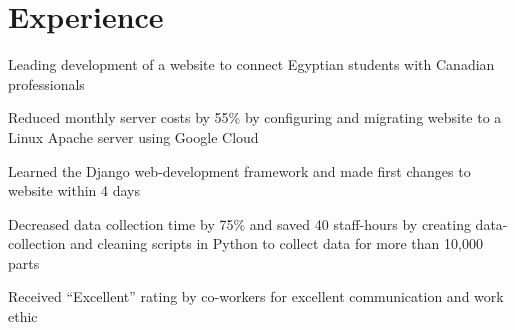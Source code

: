 \documentclass[12pt]{deedy-resume-openfont}
\begin{document}
%
%


%
%

\begin{minipage}[t] {0.66\textwidth} 


\section{Experience}

\vspace{3mm} %
\begin{tightemize}
\item Leading development of a website to connect Egyptian students with Canadian professionals
\item Reduced monthly server costs by 55\% by configuring and migrating website to a Linux Apache server using Google Cloud
\item Learned the Django web-development framework and made first changes to website within 4 days

\end{tightemize}
\sectionsep


\vspace{1mm} %
\begin{tightemize}
\item Decreased data collection time by 75\% and saved 40 staff-hours by creating data-collection and cleaning scripts in Python to collect data for more than 10,000 parts
\item Received “Excellent” rating by co-workers for excellent communication and work ethic


\end{tightemize}
\end{minipage}
\end{document}
